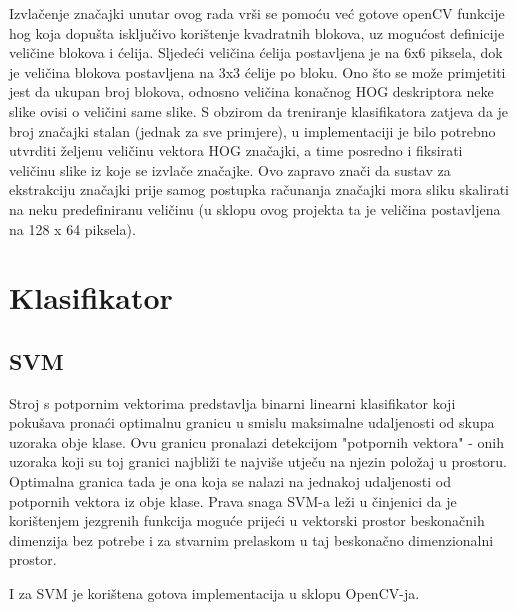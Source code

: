 \documentclass[times, utf8, seminar, numeric]{fer}
\begin{document}
Izvlačenje značajki unutar ovog rada vrši se pomoću već gotove openCV funkcije hog koja dopušta isključivo korištenje kvadratnih blokova, uz mogućost definicije veličine blokova i ćelija. Sljedeći \cite{hog1} veličina ćelija postavljena je na 6x6 piksela, dok je veličina blokova postavljena na 3x3 ćelije po bloku. Ono što se može primjetiti jest da ukupan broj blokova, odnosno veličina konačnog HOG deskriptora neke slike ovisi o veličini same slike. S obzirom da treniranje klasifikatora zatjeva da je broj značajki stalan (jednak za sve primjere), u implementaciji je bilo potrebno utvrditi željenu veličinu vektora HOG značajki, a time posredno i fiksirati veličinu slike iz koje se izvlače značajke. Ovo zapravo znači da sustav za ekstrakciju značajki prije samog postupka računanja značajki mora sliku skalirati na neku predefiniranu veličinu (u sklopu ovog projekta ta je veličina postavljena na 128 x 64 piksela).

\section{Klasifikator}
\subsection{SVM}
Stroj s potpornim vektorima predstavlja binarni linearni klasifikator koji pokušava pronaći optimalnu granicu u smislu maksimalne udaljenosti od skupa uzoraka obje klase. Ovu granicu pronalazi detekcijom "potpornih vektora" - onih uzoraka koji su toj granici najbliži te najviše utječu na njezin položaj u prostoru. Optimalna granica tada je ona koja se nalazi na jednakoj udaljenosti od potpornih vektora iz obje klase. Prava snaga SVM-a leži u činjenici da je korištenjem jezgrenih funkcija moguće prijeći u vektorski prostor beskonačnih dimenzija bez potrebe i za stvarnim prelaskom u taj beskonačno dimenzionalni prostor.

I za SVM je korištena gotova implementacija u sklopu OpenCV-ja.
\end{document}
